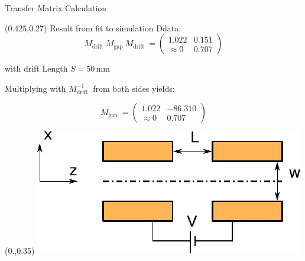 \documentclass[10pt,aspectratio=169]{beamer}
\begin{document}
\begin{frame}{Transfer Matrix Calculation}
    \begin{textblock*}{0.5\paperwidth}(0.425\paperwidth,0.27\paperheight)
        \centering
        Result from fit to simulation Ddata:
        \begin{equation*}
            M_\text{drift  } M_\text{gap  } M_\text{drift  } = \begin{pmatrix} 1.022 & 0.151 \\ \approx 0 & 0.707 \end{pmatrix}
        \end{equation*}

        with drift Length $S=50$\,mm

         \vspace{0.1\paperheight}
        
        Multiplying with $M_\text{drift  }^{-1}$ from both sides yields: 

        \begin{equation*}
            M_\text{gap  } = \begin{pmatrix} 1.022 & -86.310  \\ \approx 0 & 0.707 \end{pmatrix}
        \end{equation*}

            
    \end{textblock*}
    \begin{textblock*}{0.5\paperwidth}(0.\paperwidth,0.35\paperheight)
		\centering
		\includegraphics[width=.8\textwidth]{Exercises_presentation/images/ibs_logo.pdf}
	\end{textblock*}
  

\end{frame}
\end{document}
